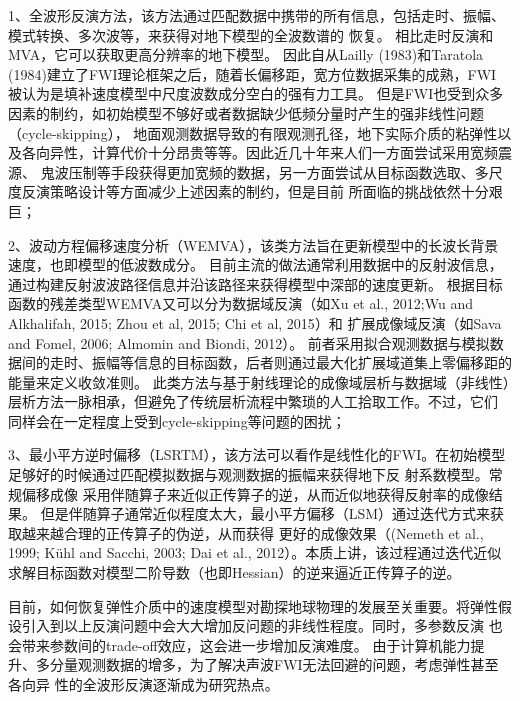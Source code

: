 1、全波形反演方法，该方法通过匹配数据中携带的所有信息，包括走时、振幅、模式转换、多次波等，来获得对地下模型的全波数谱的
恢复。
相比走时反演和MVA，它可以获取更高分辨率的地下模型。
因此自从Lailly (1983)\cite{lailly1983seismic}和Taratola (1984)\cite{tarantola1984}建立了FWI理论框架之后，随着长偏移距，宽方位数据采集的成熟，FWI
被认为是填补速度模型中尺度波数成分空白的强有力工具。
但是FWI也受到众多因素的制约，如初始模型不够好或者数据缺少低频分量时产生的强非线性问题（cycle-skipping），
地面观测数据导致的有限观测孔径，地下实际介质的粘弹性以及各向异性，计算代价十分昂贵等等。因此近几十年来人们一方面尝试采用宽频震源、
鬼波压制等手段获得更加宽频的数据，另一方面尝试从目标函数选取、多尺度反演策略设计等方面减少上述因素的制约，但是目前
所面临的挑战依然十分艰巨；

2、波动方程偏移速度分析（WEMVA），该类方法旨在更新模型中的长波长背景速度，也即模型的低波数成分。
目前主流的做法通常利用数据中的反射波信息，通过构建反射波波路径信息并沿该路径来获得模型中深部的速度更新。
根据目标函数的残差类型WEMVA又可以分为数据域反演（如Xu et al., 2012\cite{xu:2012};Wu and Alkhalifah,
2015\cite[]{Wu2015b}; Zhou et al,
2015\cite[]{zhou:2015}; Chi et al, 2015\cite{chi2015}）和
扩展成像域反演（如Sava and Fomel, 2006\cite{Sava2006}; Almomin and Biondi, 2012\cite{Almomin2012}）。
前者采用拟合观测数据与模拟数据间的走时、振幅等信息的目标函数，后者则通过最大化扩展域道集上零偏移距的能量来定义收敛准则。
此类方法与基于射线理论的成像域层析与数据域（非线性）层析方法一脉相承，但避免了传统层析流程中繁琐的人工拾取工作。不过，它们
同样会在一定程度上受到cycle-skipping等问题的困扰；

3、最小平方逆时偏移（LSRTM），该方法可以看作是线性化的FWI。在初始模型足够好的时候通过匹配模拟数据与观测数据的振幅来获得地下反
射系数模型。常规偏移成像
采用伴随算子来近似正传算子的逆，从而近似地获得反射率的成像结果。
但是伴随算子通常近似程度太大，最小平方偏移（LSM）通过迭代方式来获取越来越合理的正传算子的伪逆，从而获得
更好的成像效果（(Nemeth et al., 1999\cite{Nemeth1999}; Kühl and Sacchi, 2003\cite{KuehlEtAl2003};
Dai et al.,
2012\cite{DaiEtAl2012}）。本质上讲，该过程通过迭代近似求解目标函数对模型二阶导数（也即Hessian）的逆来逼近正传算子的逆。

目前，如何恢复弹性介质中的速度模型对勘探地球物理的发展至关重要。将弹性假设引入到以上反演问题中会大大增加反问题的非线性程度。同时，多参数反演
也会带来参数间的trade-off效应，这会进一步增加反演难度。
由于计算机能力提升、多分量观测数据的增多，为了解决声波FWI无法回避的问题，考虑弹性甚至各向异
性的全波形反演逐渐成为研究热点。

